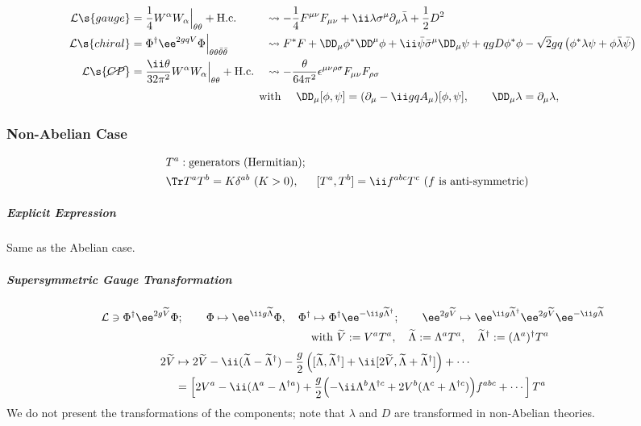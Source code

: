 \vspace{-14pt}
\begin{align*}
 \Lag\s{gauge}&= \frac14 W^\alpha W_\alpha\Big|_\thth + \Hc&&
\leadsto -\frac14F^{\mu\nu}F_{\mu\nu}+\ii\lambda\Sm\Pm\bar\lambda + \frac12 D^2\\
 \Lag\s{chiral}&=\Phi^\dagger\ee^{2gqV}\Phi\Big|_{\thth\bthth}&&
\leadsto F^*F+\Dm\phi^*\Dmu\phi+\ii\bar\psi\bSm\Dm\psi + qg D\phi^*\phi-\sqrt2gq\left(\phi^*\lambda\psi+\phi\bar\lambda\bar\psi\right)\\
 \Lag\s{\cancel{CP}}&= \frac{\ii\theta}{32\pi^2}W^\alpha W_\alpha\Big|_\thth + \Hc&&
\leadsto -\frac{\theta}{64\pi^2}\epsilon^{\mu\nu\rho\sigma}F_{\mu\nu}F_{\rho\sigma}
\end{align*}\vspace{-10pt}
\begin{equation*}
\hspace{100pt}
 \text{with\ }\quad \Dm[\phi,\psi]=(\Pm-\ii g q A_\mu)[\phi,\psi], \qquad\Dm\lambda=\Pm\lambda,
\end{equation*}


\subsubsection{Non-Abelian Case}
\begin{preposition}{}\vspace{-.5zw}
\begin{align*}
 &T^a:\text{generators (Hermitian)};\\
 &\Tr T^aT^b = K\delta^{ab}\ (K>0),&
 &[T^a,T^b]=\ii f^{abc}T^c\ \text{($f$ is anti-symmetric)}
\end{align*}\vspace{-3zw}
\end{preposition}\vspace{.7zw}

\subparagraph{Explicit Expression} Same as the Abelian case.

\subparagraph{Supersymmetric Gauge Transformation}
\begin{align}
\Lag\ni\Phi^\dagger\ee^{2g\tilde V}\Phi;
\qquad
 \Phi\mapsto \ee^{\ii g\tilde\Lambda}\Phi,\quad
 \Phi^\dagger&\mapsto \Phi^\dagger\ee^{-\ii g\tilde\Lambda^\dagger};\qquad
\ee^{2g\tilde V} \mapsto \ee^{\ii g\tilde\Lambda^\dagger}\ee^{2g\tilde V}\ee^{-\ii g\tilde\Lambda}\\
 &\text{with}\ \tilde V:=V^aT^a,\quad
 \tilde \Lambda := \Lambda^aT^a,\quad
 \tilde \Lambda^\dagger := (\Lambda^a)^\dagger T^a\notag
\end{align}
\begin{align}
 2\tilde V&\mapsto 2\tilde V-\ii(\tilde\Lambda-\tilde\Lambda^\dagger)-\frac g2\left(
 [\tilde\Lambda,\tilde\Lambda^\dagger]+\ii[2\tilde V,\tilde\Lambda+\tilde\Lambda^\dagger]\right)+\cdots\\
 &=\left[
 2V^a-\ii(\Lambda^a-\Lambda^{\dagger a})+\frac g2\Bigl(
-\ii\Lambda^b\Lambda^{\dagger c}+2V^b(\Lambda^c+\Lambda^{\dagger c})\Bigr)f^{abc}+\cdots\right]T^a
\end{align}
We do not present the transformations of the components; note that $\lambda$ and $D$ are transformed in non-Abelian theories.

